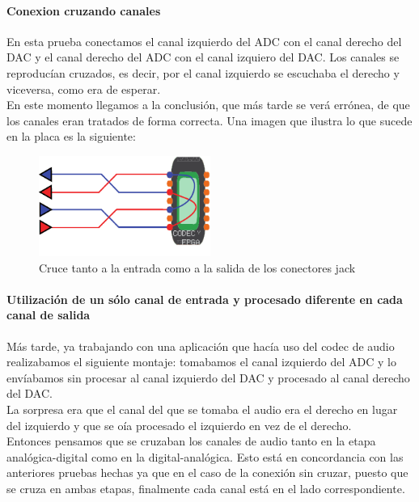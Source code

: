 		\paragraph{Conexion cruzando canales}
			En esta prueba conectamos el canal izquierdo del ADC con el canal derecho del DAC y el canal derecho del ADC con el canal izquiero del DAC. Los canales se reproducían cruzados, es decir, por el canal izquierdo se escuchaba el derecho y viceversa, como era de esperar.\\

En este momento llegamos a la conclusión, que más tarde se verá errónea, de que los canales eran tratados de forma correcta. Una imagen que ilustra lo que sucede en la placa es la siguiente:
\begin{figure}[h]
\begin{center}
	\includegraphics[width=0.5\textwidth]{./swapping_channels-eps-converted-to}
\caption{Cruce tanto a la entrada como a la salida de los conectores jack}
\end{center}
\end{figure}

		\paragraph{Utilización de un sólo canal de entrada y procesado diferente en cada canal de salida}
	
			Más tarde, ya trabajando con una aplicación que hacía uso del codec de audio realizabamos el siguiente montaje: tomabamos el canal izquierdo del ADC y lo envíabamos sin procesar al canal izquierdo del DAC y procesado al canal derecho del DAC.\\

La sorpresa era que el canal del que se tomaba el audio era el derecho en lugar del izquierdo y que se oía procesado el izquierdo en vez de el derecho.\\

Entonces pensamos que se cruzaban los canales de audio tanto en la etapa analógica-digital como en la digital-analógica. Esto está en concordancia con las anteriores pruebas hechas ya que en el caso de la conexión sin cruzar, puesto que se cruza en ambas etapas, finalmente cada canal está en el lado correspondiente.\\

